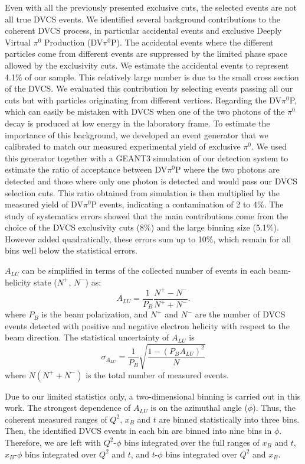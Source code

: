 \documentclass[nofootinbib,twocolumn,showpacs,prl,superscriptaddress,secnumarabic,amssymb,nobibnotes,aps,floatfix]{revtex4}
\begin{document}
Even with all the previously presented exclusive cuts, the selected events are
not all true DVCS events. We identified several background contributions to the 
coherent DVCS process, in particular accidental events and exclusive Deeply 
Virtual $\pi^0$ Production (DV$\pi^0$P). The accidental events where the 
different particles come from different events are suppressed by the limited 
phase space allowed by the exclusivity cuts. We estimate the accidental events 
to represent 4.1\% of our sample. This relatively large number is due to the 
small cross section of the DVCS. We evaluated this contribution by selecting 
events passing all our cuts but with particles originating from different 
vertices. Regarding the DV$\pi^0$P, which can easily be mistaken with DVCS when 
one of the two photons of the $\pi^0$ decay is produced at low energy in the 
laboratory frame. To estimate the importance of this background, we developed 
an event generator that we calibrated to match our measured experimental yield 
of exclusive $\pi^0$. We used this generator together with a GEANT3 simulation 
of our detection system to estimate the ratio of acceptance between DV$\pi^0$P 
where the two photons are detected and those where only one photon is detected 
and would pass our DVCS selection cuts. This ratio obtained from simulation is 
then multiplied by the measured yield of DV$\pi^0$P events, indicating a 
contamination of 2 to 4\%. The study of systematics errors showed that the main 
contributions come from the choice of the DVCS exclusivity cuts (8\%) and the 
large binning size (5.1\%). However added quadratically, these errors sum up to 
10\%, which remain for all bins well below the statistical errors.

$A_{LU}$ can be simplified in terms of the collected number of events in each 
beam-helicity state ($N^{+}$, $N^{-}$) as:
\begin{equation}
A_{LU} = \frac{1}{P_{B}} \frac{N^{+} - N^{-}}{N^{+} + N^{-} }.
\end{equation}
where $P_{B}$ is the beam polarization, and $N^{+}$ and $N^{-}$ are the number 
of DVCS events detected with positive and negative electron helicity with 
respect to the beam direction. The statistical uncertainty of $A_{LU}$ is
\begin{equation}
   \sigma_{A_{LU}} = \frac{1}{P_{B}} \sqrt{ \frac{1 - (P_{B}A_{LU})^{2}}{N}}
\end{equation}
where $N (N^{+} + N^{-}) $ is the total number of measured events.

Due to our limited statistics only, a two-dimensional binning is carried out in 
this work. The strongest dependence of $A_{LU}$ is on the azimuthal angle 
($\phi$). Thus, the coherent measured ranges of $Q^{2}$, $x_{B}$ and $t$ are 
binned statistically into three bins. Then, the identified DVCS events in each 
bin are binned into nine bins in $\phi$.  Therefore, we are left
with $Q^{2}$-$\phi$ bins integrated over the full ranges of $x_{B}$ and $t$, 
$x_{B}$-$\phi$ bins integrated over $Q^{2}$ and $t$, and $t$-$\phi$ bins 
integrated over $Q^{2}$ and $x_{B}$.
\end{document}
